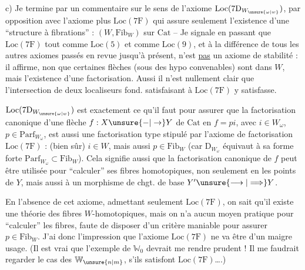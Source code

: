 c) Je termine par un commentaire sur le sens de l'axiome $\mathrm{Loc}(7\mathrm{D}_{W_{\unsure{\omega|w}}})$, par opposition avec l'axiome plus  $\mathrm{Loc}(7\mathrm{F})$ qui assure seulement l'existence d'une ``structure à fibrations'' : $(W,\mathrm{Fib}_W)$ sur $\mathrm{Cat}$ -- Je signale  en passant que $\mathrm{Loc}(7\mathrm{F})$ tout comme $\mathrm{Loc}(5)$ et comme $\mathrm{Loc}(9)$, et à la différence de tous les autres axiomes passés en revue jusqu'à présent, n'est \uline{pas} un axiome de stabilité : il affirme, non que certaines flèches (sous des hypo convenables) sont dans $W$, mais l'existence d'une factorisation. Aussi il n'est
nullement clair que l'intersection de deux localiseurs fond. satisfaisant à $\mathrm{Loc}(7\mathrm{F})$ y satisfasse.

$\mathrm{Loc}(7\mathrm{D}_{W_{\unsure{\omega|w}}})$ est exactement ce qu'il faut pour assurer que la factorisation canonique d'une flèche $f:X\unsure{-|\to}Y$ de $\mathrm{Cat}$ en $f=pi$, avec $i\in W_\omega$, $p\in\mathrm{Parf}_{W_\omega}$, est aussi une factorisation   type stipulé par l'axiome de factorisation $\mathrm{Loc}(7\mathrm{F})$ :  (bien sûr) $i\in W$, mais aussi $p\in\mathrm{Fib}_W$ (car $\mathrm{D}_{W_\omega}$ équivaut à sa forme forte $\mathrm{Parf}_{W_\omega}\subset\mathrm{Fib}_W$). Cela signifie aussi que la factorisation canonique de $f$ peut être utilisée pour ``calculer'' ses fibres homotopiques, non seulement en les points de $Y$, mais aussi  à un morphisme de chgt. de base $Y'\unsure{\longrightarrow|\Longrightarrow}Y$. 

En l'absence de cet axiome,
admettant seulement $\mathrm{Loc}(7\mathrm{F})$, on sait qu'il existe une théorie des fibres $W$-homotopiques, mais on n'a  aucun moyen pratique pour ``calculer'' les fibres, faute de disposer d'un critère maniable  pour assurer $p\in\mathrm{Fib}_W$. J'ai donc l'impression que l'axiome $\mathrm{Loc}(7\mathrm{F})$ ne va être d'un maigre usage. (Il est vrai que l'exemple de $\mathbb W_0$ devrait me rendre prudent ! Il me faudrait regarder le cas des $\mathbb W_{\unsure{n|m}}$, s'ils satisfont $\mathrm{Loc}(7\mathrm{F})$\ldots.)

